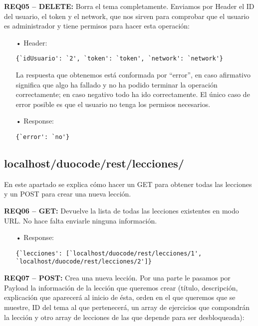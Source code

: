\textbf{REQ05 – DELETE:} Borra el tema completamente. Enviamos por Header el ID del usuario, el token y el network, que nos sirven para comprobar que el usuario es administrador y tiene permisos para hacer esta operación:
\begin{itemize}
\item[•]Header:
{\codesize
\begin{verbatim}
{`idUsuario': `2', `token': `token', `network': `network'}
\end{verbatim}
}

La respuesta que obtenemos está conformada por ``error'', en caso afirmativo significa que algo ha fallado y no ha podido terminar la operación correctamente; en caso negativo todo ha ido correctamente. El único caso de error posible es que el usuario no tenga los permisos necesarios.
\item[•]Response: 
{\codesize
\begin{verbatim}
{`error': `no'}
\end{verbatim}
}
\end{itemize}

\subsection{localhost/duocode/rest/lecciones/}
En este apartado se explica cómo hacer un GET para obtener todas las lecciones y un POST para crear una nueva lección.
\vspace{1em}

\textbf{REQ06 – GET:} Devuelve la lista de todas las lecciones existentes en modo URL. No hace falta enviarle ninguna información. 
\begin{itemize}
\item[•]Response:
{\codesize
\begin{verbatim}
{`lecciones': [`localhost/duocode/rest/lecciones/1', 
`localhost/duocode/rest/lecciones/2']}
\end{verbatim}
}
\end{itemize}

\textbf{REQ07 – POST:} Crea una nueva lección. Por una parte le pasamos por Payload la información de la lección que queremos crear (título, descripción, explicación que aparecerá al inicio de ésta, orden en el que queremos que se muestre, ID del tema al que pertenecerá, un array de ejercicios que compondrán la lección y otro array de lecciones de las que depende para ser desbloqueada):

